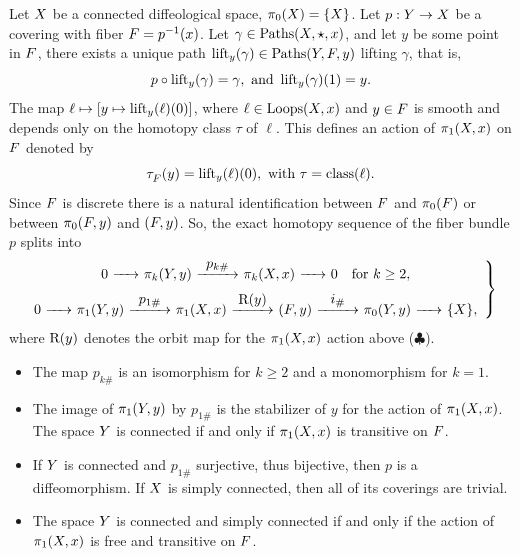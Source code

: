 \begin{article}
  \label{Fundamental-group-acting-on-coverings}
  Let $X$ be a connected diffeological space,
  $\pi_0(X) = \{X\}$.
  Let $p : Y \to X$ be a covering with fiber $F = p^{-1}(x)$.
  Let $\gamma \in \operatorname{Paths}(X,\star, x)$,
  and let $y$ be some point in $F$,
  there exists a unique path $\operatorname{lift}_y(\gamma) \in \operatorname{Paths}(Y,F,y)$ lifting $\gamma$,
  that is,
  $$%
  p \circ \lift_y(\gamma) = \gamma, \text{ and } \lift_y(\gamma)(1) = y.
  $$%
  The map $\ell \mapsto [y \mapsto \operatorname{lift}_y(\ell)(0)]$,
  where $\ell \in \operatorname{Loops}(X,x)$ and $y \in F$ is smooth and depends only on the homotopy class $\tau$ of $\ell$.
  This defines an action of $\pi_1(X,x)$ on $F$ denoted by
  \begin{equation}
    \renewcommand{\theequation}{$\clubsuit$}
    \vartau_\F(y) = \lift_y(\ell)(0), \text{ with } \tau = \class(\ell).
  \end{equation}
  Since $F$ is discrete there is a natural identification between $F$ and $\pi_0(F)$ or between $\pi_0(F,y)$ and $(F,y)$.
  So,
  the exact homotopy sequence of the fiber bundle $p$  splits into
  $$%
  \left.
  \begin{array}{c}
    0 \rfl{} \pi_k(\Y,y)
    \xrfl{p_{k\#}}{13mm} \pi_k(\X,x)
    \rfl{} 0 \quad \text{for } k \geq 2, \\
    \vspace{-2mm} \\
    0 \rfl{} \pi_1(\Y,y)
    \xrfl{p_{1\#}}{13mm} \pi_1(\X,x)
    \xrfl{\orb{y}}{13mm} (\F,y)
    \xrfl{i_\#}{13mm}
    \pi_0(\Y,y)
    \rfl{} \{\X\},
  \end{array}
  \right\}
  $$%
  where $\mathrm{R}(y)$ denotes the orbit map for the $\pi_1(X,x)$ action above ($\clubsuit$).
  \begin{itemize}
    \item[1.] The map $p_{k\#}$ is an isomorphism for $k \geq 2$ and a monomorphism for $k = 1$.
    
    \item[2.] The image of $\pi_1(Y,y)$ by $p_{1\#}$ is the stabilizer of $y$ for the action of $\pi_1(X,x)$.
    The space $Y$ is connected if and only if $\pi_1(X,x)$ is transitive on $F$.
    
    \item[3.] If $Y$ is connected and $p_{1\#}$ surjective,
    thus bijective,
    then $p$ is a diffeomorphism. If $X$ is simply connected,
    then all of its coverings are trivial.
    
    \item[4.] The space $Y$ is connected and simply connected if and only if the action of $\pi_1(X,x)$ is free and transitive on $F$.
  \end{itemize}
\end{article} %

